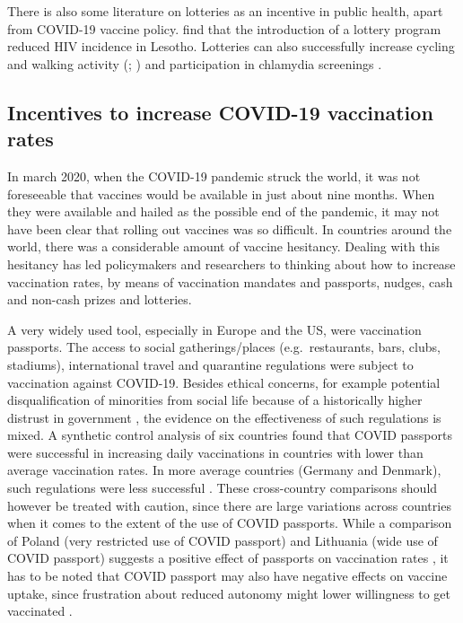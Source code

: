 \documentclass{scrbook}
\begin{document}
There is also some literature on lotteries as an incentive in public
health, apart from COVID-19 vaccine policy.
\textcite{bjorkman_nyqvist_incentivizing_2018} find that the
introduction of a lottery program reduced HIV incidence in Lesotho.
Lotteries can also successfully increase cycling and walking activity
(\cite{ciccone_using_2021}; \cite{patel_randomized_2018}) and
participation in chlamydia screenings \parencite{niza_vouchers_2014}.

\subsection*{Incentives to increase COVID-19 vaccination rates}

In march 2020, when the COVID-19 pandemic struck the world, it was not
foreseeable that vaccines would be available in just about nine months.
When they were available and hailed as the possible end of the pandemic,
it may not have been clear that rolling out vaccines was so difficult.
In countries around the world, there was a considerable amount of
vaccine hesitancy. Dealing with this hesitancy has led policymakers and
researchers to thinking about how to increase vaccination rates, by
means of vaccination mandates and passports, nudges, cash and non-cash
prizes and lotteries.

A very widely used tool, especially in Europe and the US, were
vaccination passports. The access to social gatherings/places
(e.g.~restaurants, bars, clubs, stadiums), international travel and
quarantine regulations were subject to vaccination against COVID-19.
Besides ethical concerns, for example potential disqualification of
minorities from social life because of a historically higher distrust in
government \parencite{gostin_digital_2021}, the evidence on the
effectiveness of such regulations is mixed. A synthetic control analysis
of six countries found that COVID passports were successful in
increasing daily vaccinations in countries with lower than average
vaccination rates. In more average countries (Germany and Denmark), such
regulations were less successful \parencite{mills_effect_2022}. These
cross-country comparisons should however be treated with caution, since
there are large variations across countries when it comes to the extent
of the use of COVID passports. While a comparison of Poland (very
restricted use of COVID passport) and Lithuania (wide use of COVID
passport) suggests a positive effect of passports on vaccination rates
\parencite{walkowiak_covid-19_2021}, it has to be noted that COVID
passport may also have negative effects on vaccine uptake, since
frustration about reduced autonomy might lower willingness to get
vaccinated \parencite{porat_vaccine_2021}.
\end{document}
